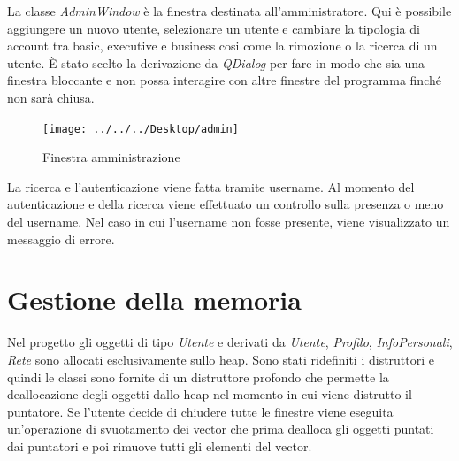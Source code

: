 \documentclass[11pt]{article}
\begin{document}
	La classe \textit{AdminWindow} è la finestra destinata all'amministratore. Qui è possibile aggiungere un nuovo utente, selezionare un utente e cambiare la tipologia di account tra basic, executive e business cosi come la rimozione o la ricerca di un utente. È stato scelto la derivazione da \textit{QDialog} per fare in modo che sia una finestra bloccante e non possa interagire con altre finestre del programma finché non sarà chiusa.
		\begin{figure}[h]
			\centering
			\texttt{[image: ../../../Desktop/admin]}
			\caption[Finestra amministrazione]{Finestra amministrazione}
			\label{fig:admin}
		\end{figure}
		\newpage
		La ricerca e l'autenticazione viene fatta tramite username. Al momento del autenticazione e della ricerca viene effettuato un controllo sulla presenza o meno del username. Nel caso in cui l'username non fosse presente, viene visualizzato un messaggio di errore.

		\section{Gestione della memoria}
		Nel progetto gli oggetti di tipo \textit{Utente} e derivati da \textit{Utente}, \textit{Profilo}, \textit{InfoPersonali}, \textit{Rete} sono allocati esclusivamente sullo heap. Sono stati ridefiniti i distruttori e quindi le classi sono fornite di un distruttore profondo che permette la deallocazione degli oggetti dallo heap nel momento in cui viene distrutto il puntatore.
		Se l'utente decide di chiudere tutte le finestre viene eseguita un'operazione di svuotamento dei vector che prima dealloca gli oggetti puntati dai puntatori e poi rimuove tutti gli elementi del vector.
\end{document}
